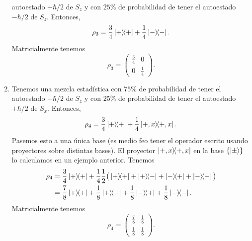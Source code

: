 \documentclass[10pt, a4paper]{article}
\numberwithin{equation}{subsection}
\begin{document}
\begin{enumerate}[label=(\alph*)]
    autoestado $+\hbar/2$ de $S_z$ y con $25\%$ de probabilidad de tener el
    autoestado $-\hbar/2$ de $S_z$. Entonces,
    \begin{equation}
      \rho_3 = \frac{3}{4}\projector{+} + \frac{1}{4}\projector{-}.
    \end{equation}
    Matricialmente tenemos
    \begin{equation}
      \rho_3 = \begin{pmatrix} \frac{3}{4} & 0 \\ 0 & \frac{1}{4}\end{pmatrix}.
    \end{equation}
  \item Tenemos una mezcla estadística con $75\%$ de probabilidad de tener el
    autoestado $+\hbar/2$ de $S_z$ y con $25\%$ de probabilidad de tener el
    autoestado $+\hbar/2$ de $S_x$. Entonces,
    \begin{equation}
      \rho_4 = \frac{3}{4}\projector{+} + \frac{1}{4}\projector{+,x}.
    \end{equation}
    Pasemos esto a una única base (es medio feo tener el operador escrito
    usando proyectores sobre distintas bases). El proyector $\projector{+,x}$
    en la base $\set{\ket{\pm}}$ lo calculamos en un ejemplo anterior. Tenemos
    \begin{align}
      \rho_4 &= \frac{3}{4}\projector{+} + \frac{1}{4}\frac{1}{2}\big(
        \ketbra{+}{+} + \ketbra{+}{-} + \ketbra{-}{+} + \ketbra{-}{-} \big)
        \nonumber \\
      &= \frac{7}{8}\projector{+} + \frac{1}{8}\ketbra{+}{-} +
        \frac{1}{8}\ketbra{-}{+} + \frac{1}{8}\ketbra{-}{-}.
    \end{align}
    Matricialmente tenemos
    {\renewcommand{\arraystretch}{1.2}%
    \begin{equation}
      \rho_4 = \begin{pmatrix} \frac{7}{8} & \frac{1}{8} \\ \frac{1}{8} &
        \frac{1}{8}\end{pmatrix}.
    \end{equation}}
\end{enumerate}
\end{document}
